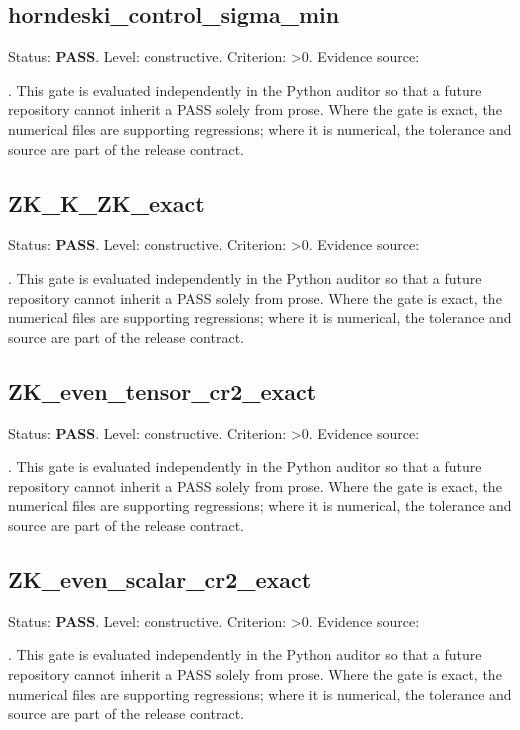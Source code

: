 \documentclass[11pt,a4paper,oneside]{book}
\begin{document}
\subsection{horndeski\_control\_sigma\_min}
Status: \textbf{PASS}. Level: constructive. Criterion: >0. Evidence source:\par\noindent{}. This gate is evaluated independently in the Python auditor so that a future repository cannot inherit a PASS solely from prose. Where the gate is exact, the numerical files are supporting regressions; where it is numerical, the tolerance and source are part of the release contract.\par

\subsection{ZK\_K\_ZK\_exact}
Status: \textbf{PASS}. Level: constructive. Criterion: >0. Evidence source:\par\noindent{}. This gate is evaluated independently in the Python auditor so that a future repository cannot inherit a PASS solely from prose. Where the gate is exact, the numerical files are supporting regressions; where it is numerical, the tolerance and source are part of the release contract.\par

\subsection{ZK\_even\_tensor\_cr2\_exact}
Status: \textbf{PASS}. Level: constructive. Criterion: >0. Evidence source:\par\noindent{}. This gate is evaluated independently in the Python auditor so that a future repository cannot inherit a PASS solely from prose. Where the gate is exact, the numerical files are supporting regressions; where it is numerical, the tolerance and source are part of the release contract.\par

\subsection{ZK\_even\_scalar\_cr2\_exact}
Status: \textbf{PASS}. Level: constructive. Criterion: >0. Evidence source:\par\noindent{}. This gate is evaluated independently in the Python auditor so that a future repository cannot inherit a PASS solely from prose. Where the gate is exact, the numerical files are supporting regressions; where it is numerical, the tolerance and source are part of the release contract.\par
\end{document}
